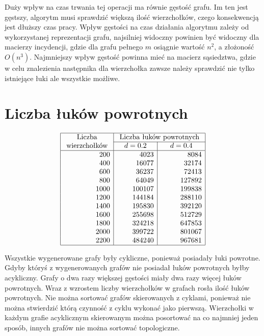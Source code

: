 \documentclass[polish,polish,a4paper]{article}
\begin{document}
\begin{spacing}{1.25}
Duży wpływ na czas trwania tej operacji ma równie gęstość grafu. Im ten jest gęstszy, algorytm musi sprawdzić większą ilość wierzchołków, czego konsekwencją jest dłuższy czas pracy. Wpływ gęstości na czas działania algorytmu zależy od wykorzystanej reprezentacji grafu, najsilniej widoczny powinien być widoczny dla macierzy incydencji, gdzie dla grafu pełnego $m$ osiągnie wartość $n^2$, a złożoność $O(n^3)$. Najmniejszy wpływ gęstość powinna mieć na macierz sąsiedztwa, gdzie w celu znalezienia następnika dla wierzchołka zawsze należy sprawdzić nie tylko istniejące łuki ale wszystkie możliwe.
	
\section{Liczba łuków powrotnych}

\begin{spacing}{1.5}
	\begin{equation*}
	\begin{array}{|r|r|r|}
	\hline
	\multicolumn{1}{|c|}{$ Liczba $}&\multicolumn{2}{c|}{$ Liczba łuków powrotnych $}\\\cline{2-3}
	\multicolumn{1}{|c|}{$ wierzchołków $}&	\multicolumn{1}{c|}{\quad d=0.2 \quad}&	\multicolumn{1}{c|}{d=0.4}\\
	\hline
	200&4023&8084\\
	400&16077&32174\\
	600&36237&72413\\
	800&64049&127892\\
	1000&100107&199838\\
	1200&144184&288110\\
	1400&195830&392120\\
	1600&255698&512729\\
	1800&324218&647853\\
	2000&399722&801067\\
	2200&484240&967681\\
	\hline
	\end{array}
	\end{equation*}
\end{spacing}

Wszystkie wygenerowane grafy były cykliczne, ponieważ posiadały łuki powrotne. Gdyby któryś z wygenerowanych grafów nie posiadał łuków powrotnych byłby acykliczny. Grafy o dwa razy większej gęstości miały dwa razy więcej łuków powrotnych. Wraz z wzrostem liczby wierzchołków w grafach rosła ilość łuków powrotnych.
Nie można sortować grafów skierowanych z cyklami, ponieważ nie można stwierdzić którą czynność z cyklu wykonać jako pierwszą.
Wierzchołki w każdym grafie acyklicznym skierowanym można posortować na co najmniej jeden sposób, innych grafów nie można sortować topologiczne.




\end{spacing}
\end{document}

